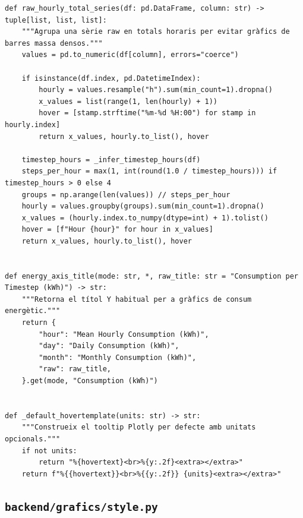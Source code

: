 \documentclass[10pt,a4paper]{article}
\begin{document}
\begin{lstlisting}[style=studioPython,caption={backend/grafics/plot\_helpers.py},label={lst:backend-grafics-plot-helpers-py}]
def raw_hourly_total_series(df: pd.DataFrame, column: str) -> tuple[list, list, list]:
    """Agrupa una sèrie raw en totals horaris per evitar gràfics de barres massa densos."""
    values = pd.to_numeric(df[column], errors="coerce")

    if isinstance(df.index, pd.DatetimeIndex):
        hourly = values.resample("h").sum(min_count=1).dropna()
        x_values = list(range(1, len(hourly) + 1))
        hover = [stamp.strftime("%m-%d %H:00") for stamp in hourly.index]
        return x_values, hourly.to_list(), hover

    timestep_hours = _infer_timestep_hours(df)
    steps_per_hour = max(1, int(round(1.0 / timestep_hours))) if timestep_hours > 0 else 4
    groups = np.arange(len(values)) // steps_per_hour
    hourly = values.groupby(groups).sum(min_count=1).dropna()
    x_values = (hourly.index.to_numpy(dtype=int) + 1).tolist()
    hover = [f"Hour {hour}" for hour in x_values]
    return x_values, hourly.to_list(), hover


def energy_axis_title(mode: str, *, raw_title: str = "Consumption per Timestep (kWh)") -> str:
    """Retorna el títol Y habitual per a gràfics de consum energètic."""
    return {
        "hour": "Mean Hourly Consumption (kWh)",
        "day": "Daily Consumption (kWh)",
        "month": "Monthly Consumption (kWh)",
        "raw": raw_title,
    }.get(mode, "Consumption (kWh)")


def _default_hovertemplate(units: str) -> str:
    """Construeix el tooltip Plotly per defecte amb unitats opcionals."""
    if not units:
        return "%{hovertext}<br>%{y:.2f}<extra></extra>"
    return f"%{{hovertext}}<br>%{{y:.2f}} {units}<extra></extra>"
\end{lstlisting}


\subsection{\texorpdfstring{\texttt{backend/grafics/style.py}}{backend/grafics/style.py}}
\end{document}
